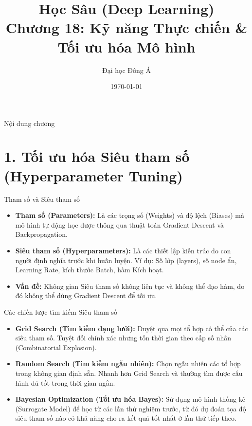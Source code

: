 \documentclass[aspectratio=169]{beamer}
\title[Chương 18: Kỹ năng Thực chiến]{Học Sâu (Deep Learning) \\ \vspace{0.5cm} \Large Chương 18: Kỹ năng Thực chiến \& Tối ưu hóa Mô hình}
\author{Đại học Đông Á}
\date{\today}
\begin{document}
\begin{frame}
    \titlepage
\end{frame}

\begin{frame}{Nội dung chương}
    \tableofcontents
\end{frame}

\section{1. Tối ưu hóa Siêu tham số (Hyperparameter Tuning)}

\begin{frame}{Tham số và Siêu tham số}
    \begin{itemize}
        \item \textbf{Tham số (Parameters):} Là các trọng số (Weights) và độ lệch (Biases) mà mô hình tự động học được thông qua thuật toán Gradient Descent và Backpropagation.
        \item \textbf{Siêu tham số (Hyperparameters):} Là các thiết lập kiến trúc do con người định nghĩa trước khi huấn luyện. Ví dụ: Số lớp (layers), số node ẩn, Learning Rate, kích thước Batch, hàm Kích hoạt.
        \item \textbf{Vấn đề:} Không gian Siêu tham số không liên tục và không thể đạo hàm, do đó không thể dùng Gradient Descent để tối ưu.
    \end{itemize}
\end{frame}

\begin{frame}{Các chiến lược tìm kiếm Siêu tham số}
    \begin{itemize}
        \item \textbf{Grid Search (Tìm kiếm dạng lưới):} Duyệt qua mọi tổ hợp có thể của các siêu tham số. Tuyệt đối chính xác nhưng tốn thời gian theo cấp số nhân (Combinatorial Explosion).
        \item \textbf{Random Search (Tìm kiếm ngẫu nhiên):} Chọn ngẫu nhiên các tổ hợp trong không gian định sẵn. Nhanh hơn Grid Search và thường tìm được cấu hình đủ tốt trong thời gian ngắn.
        \item \textbf{Bayesian Optimization (Tối ưu hóa Bayes):} Sử dụng mô hình thống kê (Surrogate Model) để học từ các lần thử nghiệm trước, từ đó dự đoán tọa độ siêu tham số nào có khả năng cho ra kết quả tốt nhất ở lần thử tiếp theo.
    \end{itemize}
\end{frame}
\end{document}

